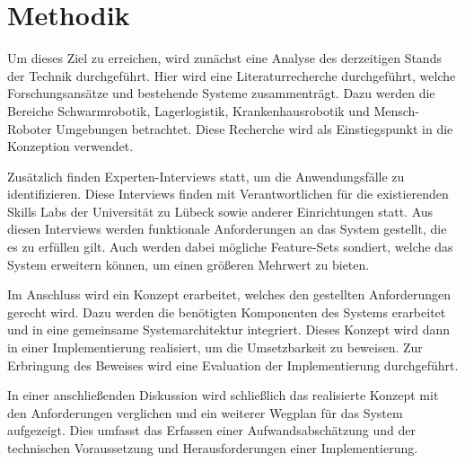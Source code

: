 \newpage \section{Methodik}

Um dieses Ziel zu erreichen, wird zunächst eine Analyse des derzeitigen Stands der Technik durchgeführt. Hier wird eine Literaturrecherche durchgeführt, welche Forschungsansätze und bestehende Systeme zusammenträgt. Dazu werden die Bereiche Schwarmrobotik, Lagerlogistik, Krankenhausrobotik und Mensch-Roboter Umgebungen betrachtet. Diese Recherche wird als Einstiegspunkt in die Konzeption verwendet.

Zusätzlich finden Experten-Interviews statt, um die Anwendungsfälle zu identifizieren. Diese Interviews finden mit Verantwortlichen für die existierenden Skills Labs der Universität zu Lübeck sowie anderer Einrichtungen statt. Aus diesen Interviews werden funktionale Anforderungen an das System gestellt, die es zu erfüllen gilt. Auch werden dabei mögliche Feature-Sets sondiert, welche das System erweitern können, um einen größeren Mehrwert zu bieten.

Im Anschluss wird ein Konzept erarbeitet, welches den gestellten Anforderungen gerecht wird. Dazu werden die benötigten Komponenten des Systems erarbeitet und in eine gemeinsame Systemarchitektur integriert. Dieses Konzept wird dann in einer Implementierung realisiert, um die Umsetzbarkeit zu beweisen. Zur Erbringung des Beweises wird eine Evaluation der Implementierung durchgeführt.

In einer anschließenden Diskussion wird schließlich das realisierte Konzept mit den Anforderungen verglichen und ein weiterer Wegplan für das System aufgezeigt. Dies umfasst das Erfassen einer Aufwandsabschätzung und der technischen Voraussetzung und Herausforderungen einer Implementierung.
